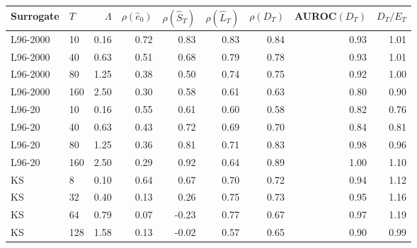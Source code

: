 \begin{tabular}{llrrrrrrr}
\toprule
Surrogate & $T$ & $\Lambda$ & $\rho(\hat e_0)$ & $\rho(\hat S_T)$ & $\rho(\hat L_T)$ & $\rho(D_T)$ & AUROC$(D_T)$ & $D_T/E_T$\\
\midrule
L96-2000 & 10 & 0.16 & 0.72 & 0.83 & 0.83 & 0.84 & 0.93 & 1.01\\
L96-2000 & 40 & 0.63 & 0.51 & 0.68 & 0.79 & 0.78 & 0.93 & 1.01\\
L96-2000 & 80 & 1.25 & 0.38 & 0.50 & 0.74 & 0.75 & 0.92 & 1.00\\
L96-2000 & 160 & 2.50 & 0.30 & 0.58 & 0.61 & 0.63 & 0.80 & 0.90\\
\midrule
L96-20 & 10 & 0.16 & 0.55 & 0.61 & 0.60 & 0.58 & 0.82 & 0.76\\
L96-20 & 40 & 0.63 & 0.43 & 0.72 & 0.69 & 0.70 & 0.84 & 0.81\\
L96-20 & 80 & 1.25 & 0.36 & 0.81 & 0.71 & 0.83 & 0.98 & 0.96\\
L96-20 & 160 & 2.50 & 0.29 & 0.92 & 0.64 & 0.89 & 1.00 & 1.10\\
\midrule
KS & 8 & 0.10 & 0.64 & 0.67 & 0.70 & 0.72 & 0.94 & 1.12\\
KS & 32 & 0.40 & 0.13 & 0.26 & 0.75 & 0.73 & 0.95 & 1.16\\
KS & 64 & 0.79 & 0.07 & -0.23 & 0.77 & 0.67 & 0.97 & 1.19\\
KS & 128 & 1.58 & 0.13 & -0.02 & 0.57 & 0.65 & 0.90 & 0.99\\
\bottomrule
\end{tabular}
